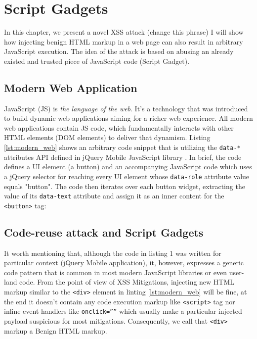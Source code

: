 \chapter{Script Gadgets}
In this chapter, we present a novel XSS attack (change this phrase) I will show how injecting benign HTML markup in a web page can also result in arbitrary JavaScript execution. The idea of the attack is based on abusing an already existed and trusted piece of JavaScript code (Script Gadget). 

\section{Modern Web Application}

JavaScript (JS) is \textit{the language of the web}. It’s a technology that was introduced to build dynamic web applications aiming for a richer web experience. All modern web applications contain JS code, which fundamentally interacts with other HTML elements (DOM elements) to deliver that dynamism. Listing \ref{lst:modern_web} shows an arbitrary code snippet that is utilizing the \verb|data-*| attributes API defined in jQuery Mobile JavaScript library \cite{paper}. In brief, the code defines a UI element (a button) and an accompanying JavaScript code which uses a jQuery selector for reaching every UI element whose \verb|data-role| attribute value equals "button". The code then iterates over each button widget, extracting the value of its \verb|data-text| attribute and assign it as an inner content for the \verb|<button>| tag:
\\


\section{Code-reuse attack and Script Gadgets}

It worth mentioning that, although the code in listing 1 was written for particular context (jQuery Mobile application), it, however, expresses a generic code pattern that is common in most modern JavaScript libraries or even user-land code. From the point of view of XSS Mitigations, injecting new HTML markup similar to the \verb|<div>| element in linting \ref{lst:modern_web} will be fine, at the end it doesn’t contain any code execution markup like \verb|<script>| tag nor inline event handlers like \verb|onclick=””| which usually make a particular injected payload suspicious for most mitigations. Consequently, we call that \verb|<div>| markup a Benign HTML markup. 

